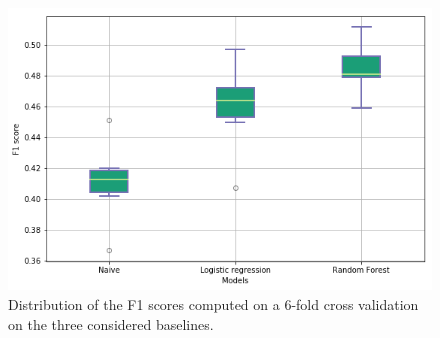 \documentclass[10pt,conference,compsocconf]{IEEEtran}
\begin{document}
\begin{figure}[tbp]
	\centering
	\includegraphics[width=0.8\columnwidth]{img/boxplots_naive.png}
	\caption{Distribution of the F1 scores computed on a 6-fold cross validation on the three considered baselines.}
	\vspace{-3mm}
	\label{fig:baselines}
\end{figure}
 
\end{document}
